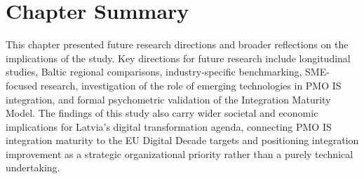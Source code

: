 \section{Chapter Summary}
\label{sec:chap5summary}

This chapter presented future research directions and broader
reflections on the implications of the study. Key directions for
future research include longitudinal studies, Baltic regional
comparisons, industry-specific benchmarking, SME-focused research,
investigation of the role of emerging technologies in PMO IS
integration, and formal psychometric validation of the Integration
Maturity Model. The findings of this study also carry wider societal
and economic implications for Latvia's digital transformation agenda,
connecting PMO IS integration maturity to the EU Digital Decade
targets and positioning integration improvement as a strategic
organizational priority rather than a purely technical undertaking.

